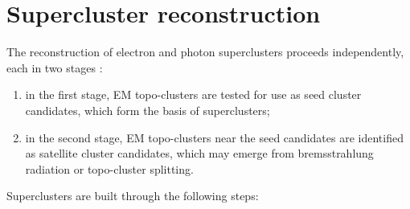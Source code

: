 \documentclass[a4paper, oneside, 11pt, openright]{book}
\begin{document}
			
		\section{Supercluster reconstruction}\label{section:super cl}
		The reconstruction of electron and photon superclusters proceeds independently, each in two stages \cite{El ph reco}:
		\begin{enumerate}
		\item in the first stage, EM topo-clusters are tested for use as seed cluster candidates, which form the basis of superclusters; 
		\item in the second stage, EM topo-clusters near the seed candidates are identified as satellite cluster candidates, which may emerge from bremsstrahlung radiation or topo-cluster splitting.
		\end{enumerate}
		Superclusters are built through the following steps:
\end{document}
